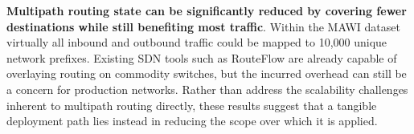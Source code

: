 \textbf{Multipath routing state can be significantly reduced by covering fewer destinations while still benefiting most traffic}. 
Within the \ac{MAWI} dataset virtually all inbound and outbound traffic could be mapped to 10,000 unique network prefixes. 
Existing \ac{SDN} tools such as RouteFlow \cite{Rothenberg:2012:RRC:2342441.2342445} are already capable of overlaying routing on commodity switches, but the incurred overhead can still be a concern for production networks.
Rather than address the scalability challenges inherent to multipath routing directly, these results suggest that a tangible deployment path lies instead in reducing the scope over which it is applied.

